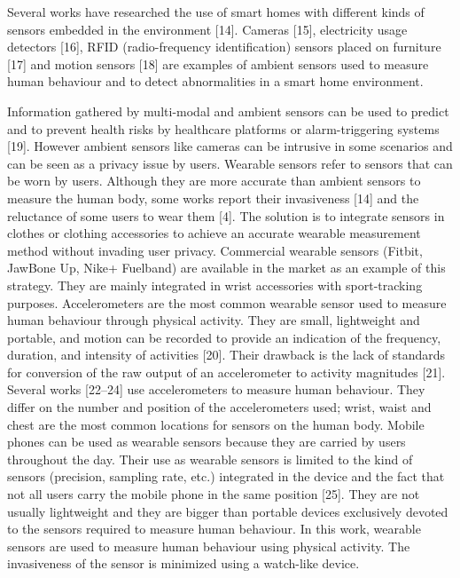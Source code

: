 Several works have researched the use of smart homes with different kinds of sensors embedded in the environment [14].
Cameras [15], electricity usage detectors [16], RFID (radio-frequency identification) sensors placed on furniture [17] and
motion sensors [18] are examples of ambient sensors used to measure human behaviour and to detect abnormalities in a
smart home environment.

Information gathered by multi-modal and ambient sensors can be used to predict and to prevent health risks by healthcare
platforms or alarm-triggering systems [19]. However ambient sensors like cameras can be intrusive in some scenarios
and can be seen as a privacy issue by users.
Wearable sensors refer to sensors that can be worn by users. Although they are more accurate than ambient sensors
to measure the human body, some works report their invasiveness [14] and the reluctance of some users to wear
them [4]. The solution is to integrate sensors in clothes or clothing accessories to achieve an accurate wearable measurement
method without invading user privacy. Commercial wearable sensors (Fitbit, JawBone Up, Nike+ Fuelband) are
available in the market as an example of this strategy. They are mainly integrated in wrist accessories with sport-tracking
purposes.
Accelerometers are the most common wearable sensor used to measure human behaviour through physical activity.
They are small, lightweight and portable, and motion can be recorded to provide an indication of the frequency, duration,
and intensity of activities [20]. Their drawback is the lack of standards for conversion of the raw output of an accelerometer
to activity magnitudes [21]. Several works [22–24] use accelerometers to measure human behaviour. They differ on the
number and position of the accelerometers used; wrist, waist and chest are the most common locations for sensors on the
human body.
Mobile phones can be used as wearable sensors because they are carried by users throughout the day. Their use as
wearable sensors is limited to the kind of sensors (precision, sampling rate, etc.) integrated in the device and the fact that
not all users carry the mobile phone in the same position [25]. They are not usually lightweight and they are bigger than
portable devices exclusively devoted to the sensors required to measure human behaviour.
In this work, wearable sensors are used to measure human behaviour using physical activity. The invasiveness of the
sensor is minimized using a watch-like device.











